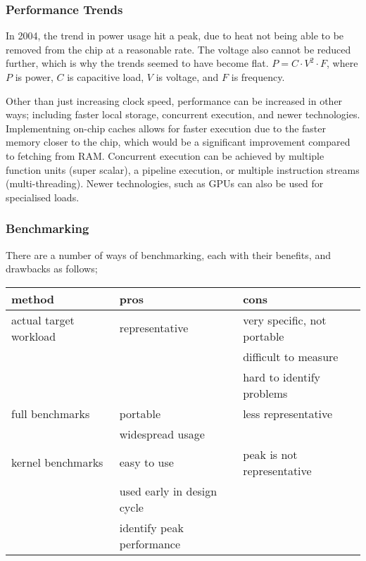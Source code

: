 \documentclass[a4paper, 12pt]{article}
\begin{document}
            \subsubsection*{Performance Trends}
                In 2004, the trend in power usage hit a peak, due to heat not being able to be removed from the chip at a reasonable rate. The voltage also cannot be reduced further, which is why the trends seemed to have become flat. $P = C \cdot V^2 \cdot F$, where $P$ is power, $C$ is capacitive load, $V$ is voltage, and $F$ is frequency.
                \medskip

                Other than just increasing clock speed, performance can be increased in other ways; including faster local storage, concurrent execution, and newer technologies. Implementning on-chip caches allows for faster execution due to the faster memory closer to the chip, which would be a significant improvement compared to fetching from RAM. Concurrent execution can be achieved by multiple function units (super scalar), a pipeline execution, or multiple instruction streams (multi-threading). Newer technologies, such as GPUs can also be used for specialised loads.
            \subsubsection*{Benchmarking}
                There are a number of ways of benchmarking, each with their benefits, and drawbacks as follows;
                \begin{center}
                    \begin{tabular}{l|l|l}
                        method & pros & cons \\
                        \hline
                        actual target workload & representative & very specific, not portable \\
                        & & difficult to measure \\
                        & & hard to identify problems \\
                        \hline
                        full benchmarks & portable & less representative \\
                        & widespread usage & \\
                        \hline
                        kernel benchmarks & easy to use & peak is not representative \\
                        & used early in design cycle & \\
                        & identify peak performance &
                    \end{tabular}
                \end{center}
\end{document}
